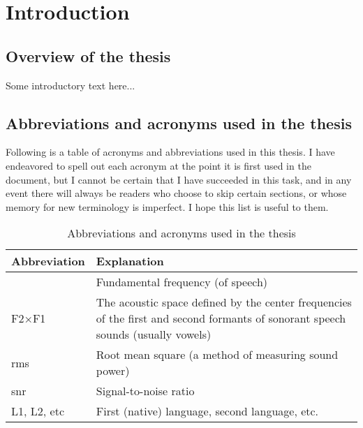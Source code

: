 \chapter{Introduction}
\section[Overview]{Overview of the thesis \label{sec:Overview}}
Some introductory text here...

\section[Abbreviations \& acronyms]{Abbreviations and acronyms used in the thesis \label{sec:Abbr}}
Following is a table of acronyms and abbreviations used in this thesis.  I have endeavored to spell out each acronym at the point it is first used in the document, but I cannot be certain that I have succeeded in this task, and in any event there will always be readers who choose to skip certain sections, or whose memory for new terminology is imperfect.  I hope this list is useful to them.

\begin{table}
	\caption[Abbreviations and acronyms]{Abbreviations and acronyms used in the thesis \label{tab:Abbr}}
	\centering
	\begin{tabu} to \textwidth [c]{X[c] X[5]}
		\toprule
		\rowfont[c]{\bfseries} Abbreviation & Explanation\\
		\midrule
		\fo & Fundamental frequency (of speech)\\
		F2×F1 & The acoustic space defined by the center frequencies of the first and second formants of sonorant speech sounds (usually vowels)\\
		\ac{rms} & Root mean square (a method of measuring sound power)\\
		\ac{snr} & Signal-to-noise ratio\\
		L1, L2, etc & First (native) language, second language, etc.\\
		\bottomrule
	\end{tabu}
\end{table}
